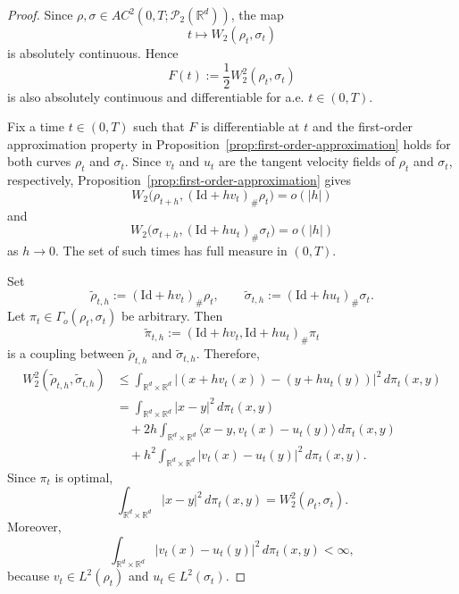 \documentclass[11pt,reqno]{amsart}
\numberwithin{figure}{section}
\newcommand{\bbr}{\mathbb R}
\newcommand{\dm}{d}
\begin{document}
\begin{proof}
Since $\rho,\sigma\in AC^2(0,T;\mathcal P_2(\mathbb R^d))$, the map
\[
t\mapsto W_2(\rho_t,\sigma_t)
\]
is absolutely continuous. Hence
\[
F(t):=\frac12W_2^2(\rho_t,\sigma_t)
\]
is also absolutely continuous and differentiable for a.e. $t\in(0,T)$.

Fix a time $t\in(0,T)$ such that $F$ is differentiable at $t$ and the
first-order approximation property in
Proposition~\ref{prop:first-order-approximation} holds for both curves
$\rho_t$ and $\sigma_t$. Since $v_t$ and $u_t$ are the tangent velocity fields
of $\rho_t$ and $\sigma_t$, respectively, Proposition~\ref{prop:first-order-approximation}
gives
\[
W_2\bigl(\rho_{t+h},(\mathrm{Id}+hv_t)_\#\rho_t\bigr)=o(|h|)
\]
and
\[
W_2\bigl(\sigma_{t+h},(\mathrm{Id}+hu_t)_\#\sigma_t\bigr)=o(|h|)
\]
as $h\to0$. The set of such times has full measure in $(0,T)$.

Set
\[
\widetilde\rho_{t,h}:=(\mathrm{Id}+hv_t)_\#\rho_t,
\qquad
\widetilde\sigma_{t,h}:=(\mathrm{Id}+hu_t)_\#\sigma_t .
\]
Let $\pi_t\in\Gamma_o(\rho_t,\sigma_t)$ be arbitrary. Then
\[
\widetilde\pi_{t,h}
:=
(\mathrm{Id}+hv_t,\mathrm{Id}+hu_t)_\#\pi_t
\]
is a coupling between $\widetilde\rho_{t,h}$ and
$\widetilde\sigma_{t,h}$. Therefore,
\[
\begin{aligned}
W_2^2(\widetilde\rho_{t,h},\widetilde\sigma_{t,h})
&\le
\int_{\mathbb R^{d}\times\bbr^\dm}
\left|
(x+hv_t(x))-(y+hu_t(y))
\right|^2
\,d\pi_t(x,y) \\
&=
\int_{\mathbb R^{d}\times\bbr^\dm}
|x-y|^2\,d\pi_t(x,y) \\
&\quad
+
2h
\int_{\mathbb R^{d}\times\bbr^\dm}
\langle x-y,v_t(x)-u_t(y)\rangle
\,d\pi_t(x,y) \\
&\quad
+
h^2
\int_{\mathbb R^{d}\times\bbr^\dm}
|v_t(x)-u_t(y)|^2\,d\pi_t(x,y).
\end{aligned}
\]
Since $\pi_t$ is optimal,
\[
\int_{\mathbb R^{d}\times\bbr^\dm}|x-y|^2\,d\pi_t(x,y)
=
W_2^2(\rho_t,\sigma_t).
\]
Moreover,
\[
\int_{\mathbb R^{d}\times\bbr^\dm}
|v_t(x)-u_t(y)|^2\,d\pi_t(x,y)
<\infty,
\]
because $v_t\in L^2(\rho_t)$ and $u_t\in L^2(\sigma_t)$.


\end{proof}
\end{document}
